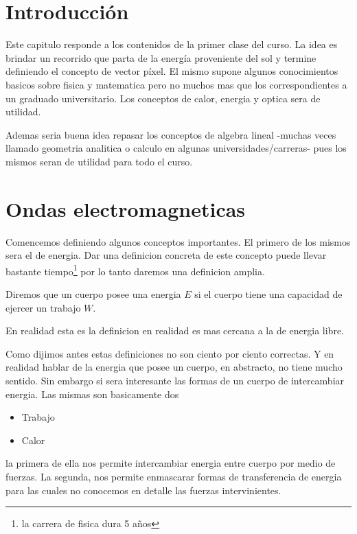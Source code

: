 \section{Introducción}
Este capitulo responde a los contenidos de la primer clase del curso. La idea es
brindar un recorrido que parta de la energía proveniente del sol y termine
definiendo el concepto de vector píxel. El mismo supone algunos conocimientos
basicos sobre fisica y matematica pero no muchos mas que los correspondientes a
un graduado universitario. Los conceptos de calor, energia y optica sera de
utilidad.

Ademas seria buena idea repasar los conceptos de algebra lineal -muchas veces
llamado geometria analitica o calculo en algunas universidades/carreras- pues
los mismos seran de utilidad para todo el curso.

\section{Ondas electromagneticas}

Comencemos definiendo algunos conceptos importantes. El primero de los mismos
sera el de energia. Dar una definicion concreta de este concepto puede llevar
bastante tiempo\footnote{la carrera de fisica dura 5 años} por lo tanto daremos
una definicion amplia.
\begin{dex}
  Diremos que un cuerpo posee una energia $E$ si el cuerpo tiene una capacidad de
  ejercer un trabajo $W$.
\end{dex}

\begin{obs}
  En realidad esta es la definicion en realidad es mas cercana a la de energia
  libre.
\end{obs}

Como dijimos antes estas definiciones no son ciento por ciento correctas. Y en
realidad hablar de la energia que posee un cuerpo, en abstracto, no tiene mucho
sentido. Sin embargo si sera interesante las formas de un cuerpo de intercambiar
energia. Las mismas son basicamente dos

\begin{itemize}
  \item Trabajo
  \item Calor
\end{itemize}

la primera de ella nos permite intercambiar energia entre cuerpo por medio de
fuerzas. La segunda, nos permite enmascarar formas de transferencia de energia
para las cuales no conocemos en detalle las fuerzas intervinientes.

